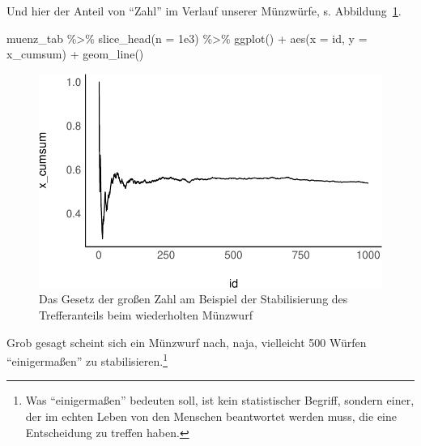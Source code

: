 \documentclass[
  a4paper,
  DIV=11]{scrreprt}
\newenvironment{Shaded}{\begin{snugshade}}{\end{snugshade}}
\newcommand{\AttributeTok}[1]{\textcolor[rgb]{0.40,0.45,0.13}{#1}}
\newcommand{\FloatTok}[1]{\textcolor[rgb]{0.68,0.00,0.00}{#1}}
\newcommand{\FunctionTok}[1]{\textcolor[rgb]{0.28,0.35,0.67}{#1}}
\newcommand{\NormalTok}[1]{\textcolor[rgb]{0.00,0.23,0.31}{#1}}
\newcommand{\SpecialCharTok}[1]{\textcolor[rgb]{0.37,0.37,0.37}{#1}}
\theoremstyle{definition}
\theoremstyle{remark}
\begin{document}
Und hier der Anteil von ``Zahl'' im Verlauf unserer Münzwürfe, s.
Abbildung~\ref{fig-lln}.

\begin{Shaded}
\begin{Highlighting}[]
\NormalTok{muenz\_tab }\SpecialCharTok{\%\textgreater{}\%} 
  \FunctionTok{slice\_head}\NormalTok{(}\AttributeTok{n =} \FloatTok{1e3}\NormalTok{) }\SpecialCharTok{\%\textgreater{}\%} 
  \FunctionTok{ggplot}\NormalTok{() }\SpecialCharTok{+}
  \FunctionTok{aes}\NormalTok{(}\AttributeTok{x =}\NormalTok{ id, }\AttributeTok{y =}\NormalTok{ x\_cumsum) }\SpecialCharTok{+}
  \FunctionTok{geom\_line}\NormalTok{()}
\end{Highlighting}
\end{Shaded}

\begin{figure}[H]

{\centering \includegraphics{./Verteilungen_files/figure-pdf/fig-lln-1.pdf}

}

\caption{\label{fig-lln}Das Gesetz der großen Zahl am Beispiel der
Stabilisierung des Trefferanteils beim wiederholten Münzwurf}

\end{figure}

Grob gesagt scheint sich ein Münzwurf nach, naja, vielleicht 500 Würfen
``einigermaßen'' zu stabilisieren.\footnote{Was ``einigermaßen''
  bedeuten soll, ist kein statistischer Begriff, sondern einer, der im
  echten Leben von den Menschen beantwortet werden muss, die eine
  Entscheidung zu treffen haben.}
\end{document}
